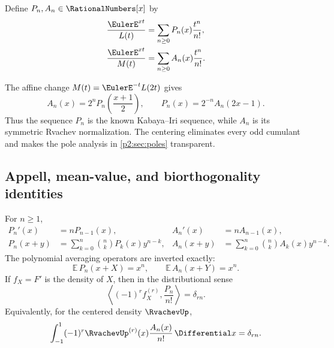\documentclass[11pt,oneside]{article}
\numberwithin{equation}{section}
\theoremstyle{definition}
\theoremstyle{remark}
\begin{document}
\begin{definition}
\label{p2:def:Appell-polys}
Define $P_n,A_n\in\RationalNumbers[x]$ by
\begin{align}
 \frac{\EulerE^{xt}}{L(t)}
 &=\sum_{n\ge0}P_n(x)\frac{t^n}{n!},
 \label{p2:eq:P-generating}\\
 \frac{\EulerE^{xt}}{M(t)}
 &=\sum_{n\ge0}A_n(x)\frac{t^n}{n!}.
 \label{p2:eq:A-generating}
\end{align}
\end{definition}

The affine change $M(t)=\EulerE^{-t}L(2t)$ gives
\begin{equation}
 \boxed{
 A_n(x)=2^nP_n\!\left(\frac{x+1}{2}\right),
 \qquad
 P_n(x)=2^{-n}A_n(2x-1).
 }
 \label{p2:eq:A-P-affine}
\end{equation}
Thus the sequence $P_n$ is the known Kabaya--Iri sequence, while $A_n$ is its symmetric Rvachev
normalization.  The centering eliminates every odd cumulant and makes the pole analysis in
\cref{p2:sec:poles} transparent.

\subsection{Appell, mean-value, and biorthogonality identities}

\begin{proposition}
\label{p2:prop:Appell-package}
For $n\ge1$,
\begin{align}
 P_n'(x)&=nP_{n-1}(x),
 &A_n'(x)&=nA_{n-1}(x),
 \label{p2:eq:Appell-derivative}\\
 P_n(x+y)&=\sum_{k=0}^n\binom nkP_k(x)y^{n-k},
 &A_n(x+y)&=\sum_{k=0}^n\binom nkA_k(x)y^{n-k}.
 \label{p2:eq:Appell-translation}
\end{align}
The polynomial averaging operators are inverted exactly:
\begin{equation}
 \boxed{
 \mathbb E\,P_n(x+X)=x^n,
 \qquad
 \mathbb E\,A_n(x+Y)=x^n.
 }
 \label{p2:eq:mean-value-inversion}
\end{equation}
If $f_X=F'$ is the density of $X$, then in the distributional sense
\begin{equation}
 \left\langle(-1)^r f_X^{(r)},\frac{P_n}{n!}\right\rangle=\delta_{rn}.
 \label{p2:eq:P-biorthogonal}
\end{equation}
Equivalently, for the centered density $\RvachevUp$,
\begin{equation}
 \int_{-1}^{1}(-1)^r\RvachevUp^{(r)}(x)\frac{A_n(x)}{n!}\,\Differential x
 =\delta_{rn}.
 \label{p2:eq:A-biorthogonal}
\end{equation}
\end{proposition}
\end{document}
